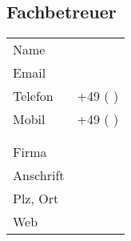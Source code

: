 \subsection{Fachbetreuer
}\label{subsec:mentor}

\begin{tabularx}{0.95\textwidth}{l X}
    Name    &
    \\
    Email   & \sitHref[mail@domain.ext]{%
              mailto:mail@domain.ext}
    \\
    Telefon & +49 ( )
    \\
    Mobil   & +49 ( )
    \\ \\ \hline \\
    Firma   &
    \\
    Anschrift &
    \\
    Plz, Ort  &
    \\
    Web     &
    \sitHref[www.domain.ext]{%
      http://www.domain.ext}
\end{tabularx}
